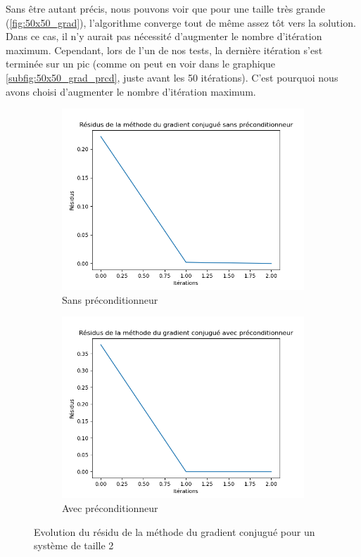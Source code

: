 \documentclass{article}
\begin{document}
Sans être autant précis, nous pouvons voir que pour une taille très grande (\ref{fig:50x50_grad}), l'algorithme converge tout de même assez tôt vers la solution. Dans ce cas, il n'y aurait pas nécessité d'augmenter le nombre d'itération maximum. Cependant, lors de l'un de nos tests, la dernière itération s'est terminée sur un pic (comme on peut en voir dans le graphique \ref{subfig:50x50_grad_prcd}, juste avant les 50 itérations). C'est pourquoi nous avons choisi d'augmenter le nombre d'itération maximum.

\begin{figure}[ht]
  \centering
  \begin{subfigure}{0.35\textwidth}
    \centering
    \includegraphics[width=\linewidth]{Figure_1.png}
    \caption{Sans préconditionneur}
    \label{subfig:2x2_grad_sans}
  \end{subfigure}
  \hfill
  \begin{subfigure}{0.35\textwidth}
    \centering
    \includegraphics[width=\linewidth]{Figure_5.png}
    \caption{Avec préconditionneur}
    \label{subfig:2x2_grad_prcd}
  \end{subfigure}
  \caption{Evolution du résidu de la méthode du gradient conjugué pour un système de taille 2}
  \label{fig:2x2_grad}
\end{figure}
\end{document}
